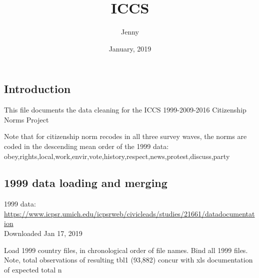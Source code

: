 \documentclass[]{article}
\title{ICCS}
\author{Jenny}
\date{January, 2019}
\begin{document}
\maketitle

\hypertarget{introduction}{%
\subsection{Introduction}\label{introduction}}

This file documents the data cleaning for the ICCS 1999-2009-2016
Citizenship Norms Project

Note that for citizenship norm recodes in all three survey waves, the
norms are coded in the descending mean order of the 1999 data:
obey,rights,local,work,envir,vote,history,respect,news,protest,discuss,party

\hypertarget{data-loading-and-merging}{%
\subsection{1999 data loading and
merging}\label{data-loading-and-merging}}

1999 data:
\url{https://www.icpsr.umich.edu/icpsrweb/civicleads/studies/21661/datadocumentation}\\
Downloaded Jan 17, 2019

Load 1999 country files, in chronological order of file names. Bind all
1999 files. Note, total observations of resulting tbl1 (93,882) concur
with xls documentation of expected total n
\end{document}
